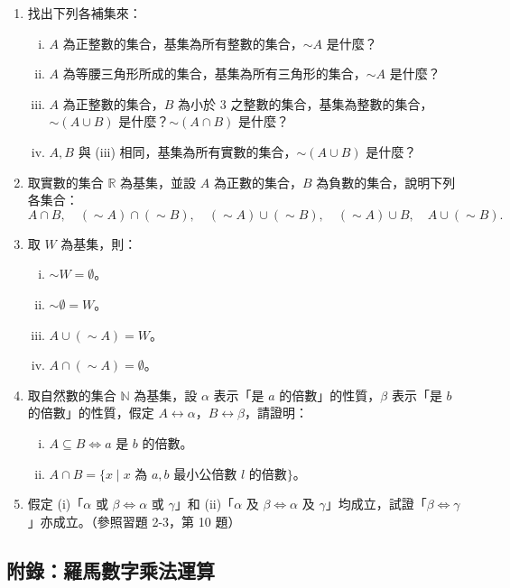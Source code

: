 \begin{enumerate}[1., leftmargin=2em]
  \item 找出下列各補集來：
  \begin{enumerate}[(i)]
    \item $A$ 為正整數的集合，基集為所有整數的集合，$\sim A$ 是什麼？
    \item $A$ 為等腰三角形所成的集合，基集為所有三角形的集合，$\sim A$ 是什麼？
    \item $A$ 為正整數的集合，$B$ 為小於 $3$ 之整數的集合，基集為整數的集合，$\sim(A \cup B)$ 是什麼？$\sim(A \cap B)$ 是什麼？
    \item $A, B$ 與 (iii) 相同，基集為所有實數的集合，$\sim(A \cup B)$ 是什麼？
  \end{enumerate}
  \item 取實數的集合 $\mathbb{R}$ 為基集，並設 $A$ 為正數的集合，$B$ 為負數的集合，說明下列各集合：
  \begin{equation*}
    A \cap B, \quad (\sim A) \cap (\sim B), \quad (\sim A) \cup (\sim B), \quad (\sim A) \cup B, \quad A \cup (\sim B).
  \end{equation*}
  \item 取 $W$ 為基集，則：
  \begin{enumerate}[(i)]
    \item $\sim W = \emptyset$。
    \item $\sim \emptyset = W$。
    \item $A \cup (\sim A) = W$。
    \item $A \cap (\sim A) = \emptyset$。
  \end{enumerate}
  \item[*] 取自然數的集合 $\mathbb{N}$ 為基集，設 $\alpha$ 表示「是 $a$ 的倍數」的性質，$\beta$ 表示「是 $b$ 的倍數」的性質，假定 $A \longleftrightarrow \alpha$，$B \longleftrightarrow \beta$，請證明：
  \begin{enumerate}[(i)]
    \item $A \subseteq B \iff a \text{ 是 } b \text{ 的倍數}$。
    \item $A \cap B = \{x \mid x \text{ 為 } a, b \text{ 最小公倍數 } l \text{ 的倍數}\}$。
  \end{enumerate}
  \item 假定 (i)「$\alpha$ 或 $\beta \iff \alpha$ 或 $\gamma$」和 (ii)「$\alpha$ 及 $\beta \iff \alpha$ 及 $\gamma$」均成立，試證「$\beta \iff \gamma$」亦成立。（參照習題 2-3，第 10 題）
\end{enumerate}

\subsection*{附錄：羅馬數字乘法運算}\label{sec:ch2-appendix}

